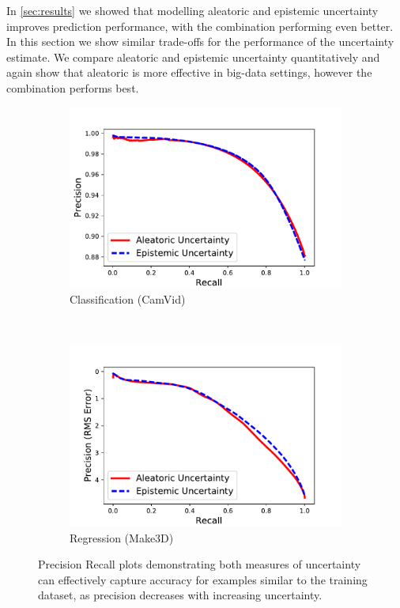 In \cref{sec:results} we showed that modelling aleatoric and epistemic uncertainty improves prediction performance, with the combination performing even better. In this section we show similar trade-offs for the performance of the uncertainty estimate. We compare aleatoric and epistemic uncertainty quantitatively and again show that aleatoric is more effective in big-data settings, however the combination performs best.

\begin{figure}[h]
    \centering
    \begin{subfigure}[t]{0.45\linewidth}
        \centering
        \includegraphics[width=\linewidth]{class_precision_recall}
        \caption{Classification (CamVid)}
    \end{subfigure}
    ~ 
    \begin{subfigure}[t]{0.45\linewidth}
        \centering
        \includegraphics[width=\linewidth]{regression_precision_recall}
        \caption{Regression (Make3D)}
    \end{subfigure}
    \caption[Precision Recall plots.]{Precision Recall plots demonstrating both measures of uncertainty can effectively capture accuracy for examples similar to the training dataset, as precision decreases with increasing uncertainty.}
\label{fig:prec_recall}
\end{figure}

